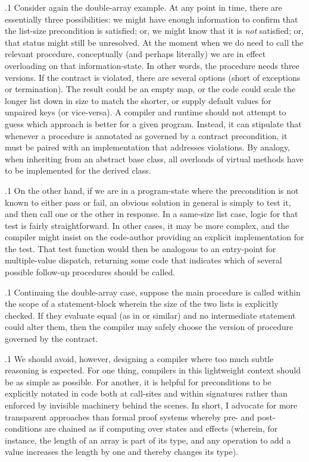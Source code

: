 \documentclass[11pt, twocolumn]{article}
\begin{document}
\p.1{%
Consider again the double-array example. At any point in time, there are
essentially three possibilities: we might have enough information
to confirm that the list-size precondition is satisfied; or, we might
know that it is \textit{not} satisfied; or, that status might still be
unresolved. At the moment when we do need to call the relevant procedure,
conceptually (and perhaps literally) we are in effect overloading
on that information-state. In other words, the procedure needs
three versions. If the contract is violated, there are several
options (short of exceptions or termination). The result could be
an empty map, or the code could scale the longer list down in size
to match the shorter, or supply default values for unpaired keys
(or vice-versa). A  compiler and
runtime should not attempt to
guess which approach is better for a given program. Instead, it
can stipulate that whenever a procedure is annotated as governed
by a contract precondition, it must be paired with an implementation
that addresses violations. By analogy, when inheriting from an
abstract base class, all overloads of virtual methods have to be
implemented for the derived class.
}%

\p.1{%
On the other hand, if we are in a program-state where the precondition
is not known to either pass or fail, an obvious solution in general
is simply to test it, and then call one or the other
 in response. In a same-size list case, logic
for that test is fairly straightforward. In other cases, it may
be more complex, and the compiler might insist on the code-author
providing an explicit implementation for the test. That test
function would then be analogous to an entry-point for
multiple-value dispatch, returning some code that indicates
which of several possible follow-up procedures should be called.
}%

\p.1{%
Continuing the double-array case, suppose the main procedure
is called within the scope of a statement-block wherein the
size of the two lists is explicitly checked. If they
evaluate equal (as in  or similar) and no
intermediate statement could alter them, then
the compiler may safely choose the version of procedure
governed by the contract.
}%

\p.1{%
We should avoid, however, designing a compiler where too much subtle reasoning
is expected. For one thing, compilers in this lightweight context should
be as simple as possible. For another, it is helpful for preconditions
to be explicitly notated in code \mdash{} both at call-sites and within
signatures \mdash{} rather than enforced by invisible machinery behind the scenes.
In short, I advocate for more transparent approaches than formal
proof systems whereby pre- and post-conditions are chained as if computing
over states and effects (wherein, for instance, the length of an array
is part of its type, and any operation to add a value increases the length
by one and thereby changes its type).
}%
\end{document}
